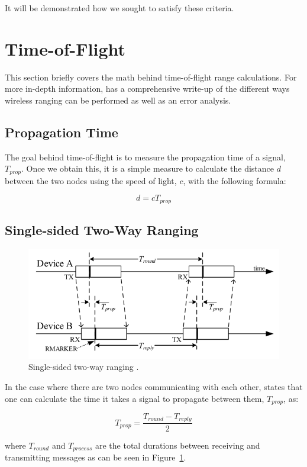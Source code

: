 It will be demonstrated how we sought to satisfy these criteria.

\section{Time-of-Flight}
This section briefly covers the math behind time-of-flight range calculations. For more in-depth information, \textcite{DW1000UserManual} has a comprehensive write-up of the different ways wireless ranging can be performed as well as an error analysis.

\subsection{Propagation Time}
The goal behind time-of-flight is to measure the propagation time of a signal, $T_{prop}$. Once we obtain this, it is a simple measure to calculate the distance $d$ between the two nodes using the speed of light, $c$, with the following formula:

\[
	d = c T_{prop}
\] 

\subsection{Single-sided Two-Way Ranging}
\begin{figure}
	\centering
	\includegraphics[width=\linewidth]{Figures/BasicRanging.png}
	\decoRule
	\caption{Single-sided two-way ranging \cite{DW1000UserManual}.}
	\label{fig:BasicRanging}
\end{figure}

In the case where there are two nodes communicating with each other, \parencite{DW1000UserManual} states that one can calculate the time it takes a signal to propagate between them, $T_{prop}$, as:

\[
	T_{prop} = \frac{T_{round} - T_{reply}}{2}
\]

where $T_{round}$ and $T_{process}$ are the total durations between receiving and transmitting messages as can be seen in Figure~\ref{fig:BasicRanging}.

